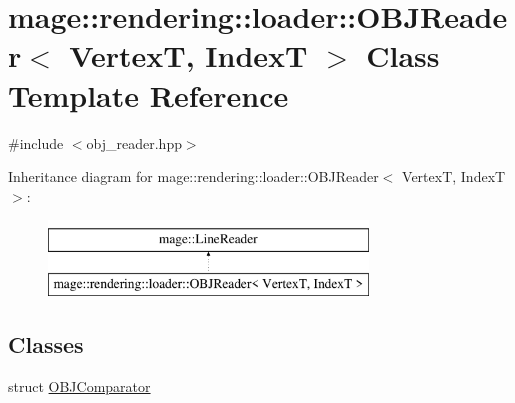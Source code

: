 \hypertarget{classmage_1_1rendering_1_1loader_1_1_o_b_j_reader}{}\section{mage\+:\+:rendering\+:\+:loader\+:\+:O\+B\+J\+Reader$<$ VertexT, IndexT $>$ Class Template Reference}
\label{classmage_1_1rendering_1_1loader_1_1_o_b_j_reader}


{\ttfamily \#include $<$obj\+\_\+reader.\+hpp$>$}

Inheritance diagram for mage\+:\+:rendering\+:\+:loader\+:\+:O\+B\+J\+Reader$<$ VertexT, IndexT $>$\+:\begin{figure}[H]
\begin{center}
\leavevmode
\includegraphics[height=2.000000cm]{classmage_1_1rendering_1_1loader_1_1_o_b_j_reader}
\end{center}
\end{figure}
\subsection*{Classes}
\begin{DoxyCompactItemize}
\item 
struct \hyperlink{structmage_1_1rendering_1_1loader_1_1_o_b_j_reader_1_1_o_b_j_comparator}{O\+B\+J\+Comparator}
\end{DoxyCompactItemize}
